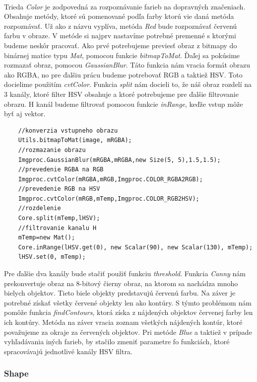 \documentclass[12pt]{article}
\begin{document}
\paragraph{}
Trieda \emph{Color} je zodpovedná za rozpoznávanie farieb na dopravných značeniach. Obsahuje metódy, ktoré sú pomenované podľa farby ktorú vie daná metóda rozpoznávať.
Už ako z názvu vyplíva, metóda \emph{Red} bude rozpoznávať červenú farbu v obraze. V metóde si najprv nastavíme potrebné premenné s ktorými budeme neskôr pracovať.
Ako prvé potrebujeme previesť obraz z bitmapy do binárnej matice typu \emph{Mat}, pomocou funkcie \emph{bitmapToMat}.
Ďaľej sa pokúsime rozmazať obraz, pomocou \emph{GaussianBlur}. Táto funkcia nám vracia formát obrazu ako RGBA, no pre ďalšiu prácu budeme potrebovať RGB a taktiež HSV.
Toto docielime použitím \emph{cvtColor}. Funkcia \emph{split} nám docieli to, že náš obraz rozdelí na 3 kanály, ktoré filter HSV obsahuje a ktoré potrebujeme pre ďalšie filtrovanie obrazu.
H kanál budeme filtrovať pomocou funkcie \emph{inRange}, keďže vstup môže byť aj vektor.
\begin{lstlisting}
	//konverzia vstupneho obrazu
	Utils.bitmapToMat(image, mRGBA);
	//rozmazanie obrazu
	Imgproc.GaussianBlur(mRGBA,mRGBA,new Size(5, 5),1.5,1.5);
	//prevedenie RGBA na RGB
	Imgproc.cvtColor(mRGBA,mRGB,Imgproc.COLOR_RGBA2RGB);
	//prevedenie RGB na HSV
	Imgproc.cvtColor(mRGB,mTemp,Imgproc.COLOR_RGB2HSV);
	//rozdelenie
	Core.split(mTemp,lHSV);
	//filtrovanie kanalu H
	mTemp=new Mat();
	Core.inRange(lHSV.get(0), new Scalar(90), new Scalar(130), mTemp);
	lHSV.set(0, mTemp);
\end{lstlisting}
Pre ďalšie dva kanály bude stačiť použiť funkciu \emph{threshold}.
Funkcia \emph{Canny} nám prekonvertuje obraz na 8-bitový čierny obraz, na ktorom sa nachádza mnoho bielych objektov. Tieto biele objekty predstavujú červenú farbu. 
Na záver je potrebné získať všetky červené objekty len ako kontúry. S týmto problémom nám pomôže funkcia \emph{findContours}, ktorá získa z nájdených objektov červenej farby len ich kontúry.
Metóda na záver vracia zoznam všetkých nájdených kontúr, ktoré považujeme za okraje za červených objektov.
Pri metóde \emph{Blue} a taktiež v prípade vyhľadávania iných farieb, by stačilo zmeniť parametre fo funkciách, ktoré spracovávajú jednotlivé kanály HSV filtra.
\subsubsection{Shape}
\end{document}
